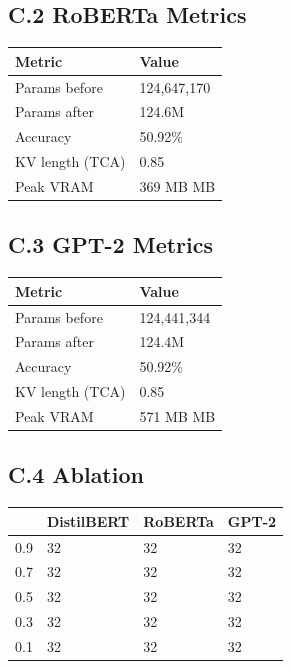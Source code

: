 \subsection{C.2 RoBERTa Metrics}

\begin{table}[H]
\centering
\small
\begin{tabular}{ll}
\toprule
\textbf{Metric} & \textbf{Value} \\
\midrule
Params before & 124,647,170 \\
Params after & 124.6M \\
Accuracy & 50.92\% \\
KV length (TCA) & 0.85 \\
Peak VRAM & 369 MB MB \\
\bottomrule
\end{tabular}
\end{table}

\subsection{C.3 GPT-2 Metrics}

\begin{table}[H]
\centering
\small
\begin{tabular}{ll}
\toprule
\textbf{Metric} & \textbf{Value} \\
\midrule
Params before & 124,441,344 \\
Params after & 124.4M \\
Accuracy & 50.92\% \\
KV length (TCA) & 0.85 \\
Peak VRAM & 571 MB MB \\
\bottomrule
\end{tabular}
\end{table}

\subsection{C.4   Ablation}

\begin{table}[H]
\centering
\small
\begin{tabular}{llll}
\toprule
\textbf{} & \textbf{DistilBERT} & \textbf{RoBERTa} & \textbf{GPT-2} \\
\midrule
0.9 & 32 & 32 & 32 \\
0.7 & 32 & 32 & 32 \\
0.5 & 32 & 32 & 32 \\
0.3 & 32 & 32 & 32 \\
0.1 & 32 & 32 & 32 \\
\bottomrule
\end{tabular}
\end{table}

